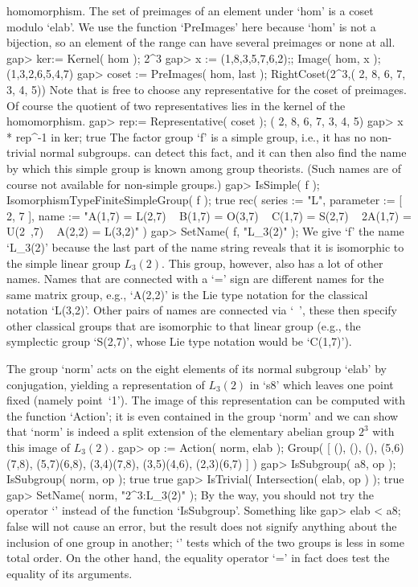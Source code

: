 homomorphism. The set of  preimages of an element under  `hom' is a coset
modulo `elab'. We use the function  `PreImages' here because `hom' is not
a bijection, so an  element of the range can   have several preimages  or
none at all.
\beginexample
gap> ker:= Kernel( hom );
2^3
gap> x := (1,8,3,5,7,6,2);; Image( hom, x );
(1,3,2,6,5,4,7)
gap> coset := PreImages( hom, last );
RightCoset(2^3,( 2, 8, 6, 7, 3, 4, 5))
\endexample
Note that {\GAP} is free to choose any representative for the coset
of preimages.
Of course the quotient of two representatives lies in the kernel of
the homomorphism.
\beginexample
gap> rep:= Representative( coset );
( 2, 8, 6, 7, 3, 4, 5)
gap> x * rep^-1 in ker;
true
\endexample
The factor  group `f'  is  a simple  group,  i.e., it has  no non-trivial
normal subgroups. {\GAP} can detect this fact,  and it can then also find
the name by which this simple group is known among group theorists. (Such
names are of course not available for non-simple groups.)
\beginexample
gap> IsSimple( f ); IsomorphismTypeFiniteSimpleGroup( f );
true
rec( series := "L", parameter := [ 2, 7 ], 
  name := "A(1,7) = L(2,7) ~ B(1,7) = O(3,7) ~ C(1,7) = S(2,7) ~ 2A(1,7) = U(2\
,7) ~ A(2,2) = L(3,2)" )
gap> SetName( f, "L_3(2)" );
\endexample
We give `f' the name  `L_3(2)' because the  last part of the name  string
reveals that  it is isomorphic to  the simple linear group $L_3(2)$. This
group, however, also has a  lot of other  names. Names that are connected
with a  `=' sign  are different names   for the same matrix group,  e.g.,
`A(2,2)' is the  Lie type notation for  the  classical notation `L(3,2)'.
Other pairs  of  names are  connected via `~',  these then  specify other
classical  groups  that are isomorphic  to that  linear  group (e.g., the
symplectic group `S(2,7)', whose Lie type notation would be `C(1,7)').

The group `norm' acts on the eight elements of its normal subgroup `elab'
by conjugation,  yielding  a representation   of $L_3(2)$ in   `s8' which
leaves one    point  fixed  (namely  point~`1').    The   image of   this
representation can be computed with the function  `Action'; it is even
contained  in the group `norm' and  we can show  that `norm'  is indeed a
split extension of the elementary abelian group $2^3$  with this image of
$L_3(2)$.
\beginexample
gap> op := Action( norm, elab );
Group( [ (), (), (), (5,6)(7,8), (5,7)(6,8), (3,4)(7,8), (3,5)(4,6), 
  (2,3)(6,7) ] )
gap> IsSubgroup( a8, op ); IsSubgroup( norm, op );
true
true
gap> IsTrivial( Intersection( elab, op ) );
true
gap> SetName( norm, "2^3:L_3(2)" );
\endexample
By the way, you should not try the operator `\<'  instead of the function
`IsSubgroup'. Something like
\beginexample
gap> elab < a8;
false
\endexample
will not cause an error, but the result does not signify anything about the
inclusion of one group in another; `\<' tests  which of the two groups is
less in some total order. On the other hand, the equality operator `=' in
fact does test the equality of its arguments.


